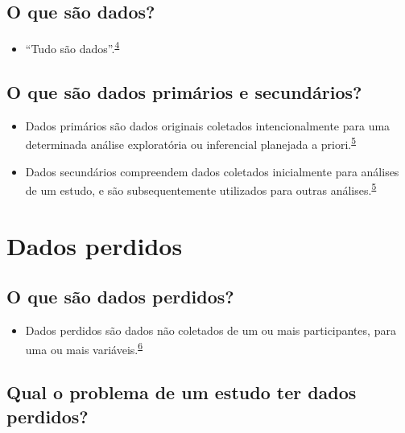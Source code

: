 \documentclass[
]{book}
\providecommand{\tightlist}{%
  \setlength{\itemsep}{0pt}\setlength{\parskip}{0pt}}
\begin{document}
\hypertarget{o-que-suxe3o-dados}{%
\subsection{O que são dados?}\label{o-que-suxe3o-dados}}

\begin{itemize}
\tightlist
\item
  ``Tudo são dados''.\textsuperscript{\protect\hyperlink{ref-Olson2021}{4}}
\end{itemize}

\hypertarget{o-que-suxe3o-dados-primuxe1rios-e-secunduxe1rios}{%
\subsection{O que são dados primários e secundários?}\label{o-que-suxe3o-dados-primuxe1rios-e-secunduxe1rios}}

\begin{itemize}
\item
  Dados primários são dados originais coletados intencionalmente para uma determinada análise exploratória ou inferencial planejada a priori.\textsuperscript{\protect\hyperlink{ref-vetter2017}{5}}
\item
  Dados secundários compreendem dados coletados inicialmente para análises de um estudo, e são subsequentemente utilizados para outras análises.\textsuperscript{\protect\hyperlink{ref-vetter2017}{5}}
\end{itemize}

\hypertarget{dados-perdidos}{%
\section{Dados perdidos}\label{dados-perdidos}}

\hypertarget{o-que-suxe3o-dados-perdidos}{%
\subsection{O que são dados perdidos?}\label{o-que-suxe3o-dados-perdidos}}

\begin{itemize}
\tightlist
\item
  Dados perdidos são dados não coletados de um ou mais participantes, para uma ou mais variáveis.\textsuperscript{\protect\hyperlink{ref-Altman2007}{6}}
\end{itemize}

\hypertarget{qual-o-problema-de-um-estudo-ter-dados-perdidos}{%
\subsection{Qual o problema de um estudo ter dados perdidos?}\label{qual-o-problema-de-um-estudo-ter-dados-perdidos}}
\end{document}
